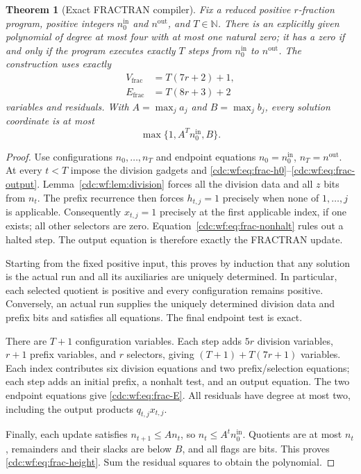 \documentclass[11pt,a4paper]{article}
\newtheorem{theorem}{Theorem}[section]
\theoremstyle{definition}
\theoremstyle{remark}
\newcommand{\N}{\mathbb N}
\begin{document}
\begin{theorem}[Exact FRACTRAN compiler]\label{cdc:wf:thm:fractran}
Fix a reduced positive $r$-fraction program, positive integers $n_0^{\mathrm{in}}$ and $n^{\mathrm{out}}$, and $T\in\N$. There is an explicitly given polynomial of degree at most four with at most one natural zero; it has a zero if and only if the program executes exactly $T$ steps from $n_0^{\mathrm{in}}$ to $n^{\mathrm{out}}$. The construction uses exactly
\begin{align}
 V_{\mathrm{frac}}&=T(7r+2)+1,\label{cdc:wf:eq:frac-V}\\
 E_{\mathrm{frac}}&=T(8r+3)+2\label{cdc:wf:eq:frac-E}
\end{align}
variables and residuals. With $A=\max_j a_j$ and $B=\max_j b_j$, every solution coordinate is at most
\begin{equation}\label{cdc:wf:eq:frac-height}
 \max\{1,A^Tn_0^{\mathrm{in}},B\}.
\end{equation}
\end{theorem}
\begin{proof}
Use configurations $n_0,\ldots,n_T$ and endpoint equations $n_0=n_0^{\mathrm{in}}$, $n_T=n^{\mathrm{out}}$. At every $t<T$ impose the division gadgets and \eqref{cdc:wf:eq:frac-h0}--\eqref{cdc:wf:eq:frac-output}. Lemma~\ref{cdc:wf:lem:division} forces all the division data and all $z$ bits from $n_t$. The prefix recurrence then forces $h_{t,j}=1$ precisely when none of $1,\ldots,j$ is applicable. Consequently $x_{t,j}=1$ precisely at the first applicable index, if one exists; all other selectors are zero. Equation~\eqref{cdc:wf:eq:frac-nonhalt} rules out a halted step. The output equation is therefore exactly the FRACTRAN update.

Starting from the fixed positive input, this proves by induction that any solution is the actual run and all its auxiliaries are uniquely determined. In particular, each selected quotient is positive and every configuration remains positive. Conversely, an actual run supplies the uniquely determined division data and prefix bits and satisfies all equations. The final endpoint test is exact.

There are $T+1$ configuration variables. Each step adds $5r$ division variables, $r+1$ prefix variables, and $r$ selectors, giving $(T+1)+T(7r+1)$ variables. Each index contributes six division equations and two prefix/selection equations; each step adds an initial prefix, a nonhalt test, and an output equation. The two endpoint equations give \eqref{cdc:wf:eq:frac-E}. All residuals have degree at most two, including the output products $q_{t,j}x_{t,j}$.

Finally, each update satisfies $n_{t+1}\leq A n_t$, so $n_t\leq A^tn_0^{\mathrm{in}}$. Quotients are at most $n_t$, remainders and their slacks are below $B$, and all flags are bits. This proves \eqref{cdc:wf:eq:frac-height}. Sum the residual squares to obtain the polynomial.
\end{proof}
\end{document}
